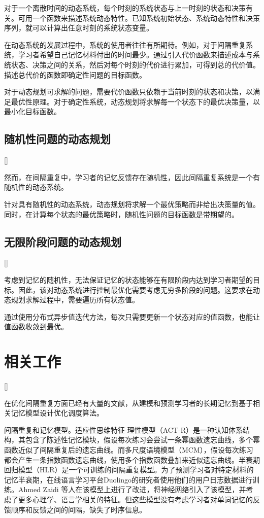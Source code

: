 对于一个离散时间的动态系统，每个时刻的系统状态与上一时刻的状态和决策有关。可用一个函数来描述系统动态特性。已知系统初始状态、系统动态特性和决策序列，就可以计算出任意时刻的系统状态变量\cite[2-4]{bertsekasReinforcementLearningOptimal2019}。

在动态系统的发展过程中，系统的使用者往往有所期待。例如，对于间隔重复系统，学习者希望自己记忆材料付出的时间最少。通过引入代价函数来描述成本与系统状态、决策之间的关系，然后对每个时刻的代价进行累加，可得到总的代价值。描述总代价的函数即确定性问题的目标函数。

对于动态规划可求解的问题，需要代价函数只依赖于当前时刻的状态和决策，以满足最优性原理。对于确定性系统，动态规划将求解每一个状态下的最优决策量，以最小化目标函数。

\subsection{随机性问题的动态规划}[]

然而，在间隔重复中，学习者的记忆反馈存在随机性，因此间隔重复系统是一个有随机性的动态系统。

针对具有随机性的动态系统，动态规划将求解一个最优策略而非给出决策量的值。同时，在计算每个状态的最优策略时，随机性问题的目标函数是带期望的\cite[14-16]{bertsekasReinforcementLearningOptimal2019}。

\subsection{无限阶段问题的动态规划}[]

考虑到记忆的随机性，无法保证记忆的状态能够在有限阶段内达到学习者期望的目标。因此，该对动态系统进行控制最优化需要考虑无穷多阶段的问题。这要求在动态规划求解过程中，需要遍历所有状态值。

通过使用分布式异步值迭代方法，每次只需要更新一个状态对应的值函数，也能让值函数收敛到最优\cite[197-200]{bertsekasReinforcementLearningOptimal2019}。

\section{相关工作}[]

在优化间隔重复方面已经有大量的文献，从建模和预测学习者的长期记忆到基于相关记忆模型设计优化调度算法。

间隔重复和记忆模型。适应性思维特征-理性模型（ACT-R）\cite{andersonIntegratedTheoryMind2004}是一种认知体系结构，其包含了陈述性记忆模块，假设每次练习会尝试一条幂函数遗忘曲线，多个幂函数近似了间隔重复后的遗忘曲线。而多尺度语境模型（MCM）\cite{pashlerPredictingOptimalSpacing2009}，假设每次练习都会产生一条指数函数遗忘曲线，使用多个指数函数叠加来近似遗忘曲线。半衰期回归模型（HLR）\cite{settlesTrainableSpacedRepetition2016}是一个可训练的间隔重复模型。为了预测学习者对特定材料的记忆半衰期，在线语言学习平台Duolingo的研究者使用他们的用户日志数据进行训练。Ahmed Zaidi 等人\cite{zaidiAdaptiveForgettingCurves2020}在该模型上进行了改进，将神经网络引入了该模型，并考虑了更多心理学、语言学相关的特征。但这些模型没有考虑学习者对单词记忆的反馈顺序和反馈之间的间隔，缺失了时序信息。

